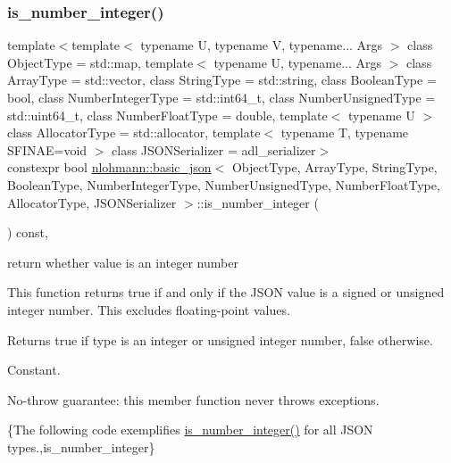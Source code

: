 \subsubsection{\texorpdfstring{is\+\_\+number\+\_\+integer()}{is\_number\_integer()}}
{\footnotesize\ttfamily template$<$template$<$ typename U, typename V, typename... Args $>$ class Object\+Type = std\+::map, template$<$ typename U, typename... Args $>$ class Array\+Type = std\+::vector, class String\+Type  = std\+::string, class Boolean\+Type  = bool, class Number\+Integer\+Type  = std\+::int64\+\_\+t, class Number\+Unsigned\+Type  = std\+::uint64\+\_\+t, class Number\+Float\+Type  = double, template$<$ typename U $>$ class Allocator\+Type = std\+::allocator, template$<$ typename T, typename S\+F\+I\+N\+A\+E=void $>$ class J\+S\+O\+N\+Serializer = adl\+\_\+serializer$>$ \\
constexpr bool \mbox{\hyperlink{classnlohmann_1_1basic__json}{nlohmann\+::basic\+\_\+json}}$<$ Object\+Type, Array\+Type, String\+Type, Boolean\+Type, Number\+Integer\+Type, Number\+Unsigned\+Type, Number\+Float\+Type, Allocator\+Type, J\+S\+O\+N\+Serializer $>$\+::is\+\_\+number\+\_\+integer (\begin{DoxyParamCaption}{ }\end{DoxyParamCaption}) const\hspace{0.3cm}{\ttfamily [inline]}, {\ttfamily [noexcept]}}



return whether value is an integer number 

This function returns true if and only if the J\+S\+ON value is a signed or unsigned integer number. This excludes floating-\/point values.

\begin{DoxyReturn}{Returns}
{\ttfamily true} if type is an integer or unsigned integer number, {\ttfamily false} otherwise.
\end{DoxyReturn}
Constant.

No-\/throw guarantee\+: this member function never throws exceptions.

\{The following code exemplifies {\ttfamily \mbox{\hyperlink{classnlohmann_1_1basic__json_abac8af76067f1e8fdca9052882c74428}{is\+\_\+number\+\_\+integer()}}} for all J\+S\+ON types.,is\+\_\+number\+\_\+integer\}


